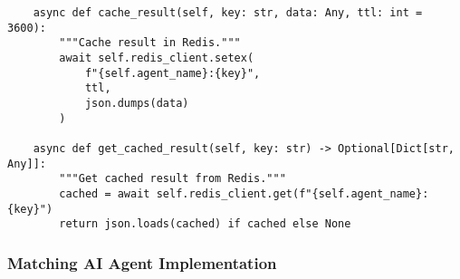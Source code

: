 \begin{verbatim}
    async def cache_result(self, key: str, data: Any, ttl: int = 3600):
        """Cache result in Redis."""
        await self.redis_client.setex(
            f"{self.agent_name}:{key}",
            ttl,
            json.dumps(data)
        )
    
    async def get_cached_result(self, key: str) -> Optional[Dict[str, Any]]:
        """Get cached result from Redis."""
        cached = await self.redis_client.get(f"{self.agent_name}:{key}")
        return json.loads(cached) if cached else None
\end{verbatim}

\subsubsection{Matching AI Agent Implementation}

